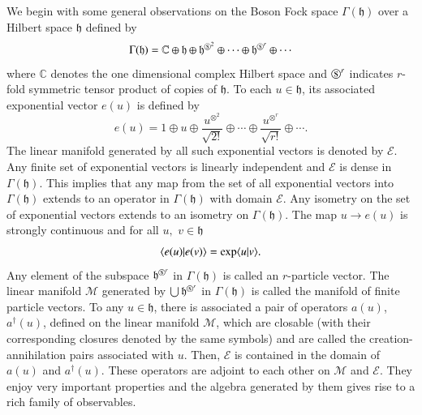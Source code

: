 We begin with some general observations on the Boson Fock space $\Gamma(\mathfrak{h})$ over a Hilbert space $\mathfrak{h}$ defined by 
\begin{equation}
\Gamma(\mathfrak{h})=\mathbb{C}\oplus \mathfrak{h} \oplus \mathfrak{h}^{\text{\textcircled{s}}^2} \oplus \cdots \oplus \mathfrak{h}^{\text{\textcircled{s}}^r}\oplus \cdots  \label{chap3-eq3.1}
\end{equation} 
where $\mathbb{C}$ denotes the one dimensional complex Hilbert space and  $\text{\textcircled{s}}^r$ indicates $r$-fold symmetric tensor product of copies of $\mathfrak{h}$. To each $u\in \mathfrak{h}$, its associated exponential vector $e(u)$ is defined by 
\begin{equation} 
e (u) = 1 \oplus u \oplus \frac{u^{\otimes^{2}}}{\sqrt{2!}}  \oplus \cdots \oplus \frac{u^{\otimes^{r}}}{\sqrt{r!}}  \oplus \cdots.\label{chap8-eq3.2}
\end{equation}
The linear manifold generated by all such exponential vectors is denoted by $\mathcal{E}$. Any finite set of exponential vectors is linearly independent and $\mathcal{E}$ is dense in $\Gamma(\mathfrak{h})$. This implies that any map from the set of all exponential vectors into 
$\Gamma(\mathfrak{h})$ extends to an operator in $\Gamma(\mathfrak{h})$ with domain $\mathcal{E}$. 
Any isometry on the set of exponential vectors extends to an isometry on $\Gamma(\mathfrak{h})$. The map $u\rightarrow e(u)$ is strongly continuous and for all $u,\,\, v\in \mathfrak{h}$ 
\begin{equation}
\langle e(u)\vert e(v)\rangle = {\rm exp}\langle u\vert v\rangle . \label{chap8-eq3.3}
\end{equation}
Any element of the subspace $\mathfrak{h}^{\text{\textcircled{s}}^r}$ in $\Gamma(\mathfrak{h})$ is called an $r$-particle vector. 
The linear manifold $\mathcal{M}$ generated by $\bigcup \mathfrak{h}^{\text{\textcircled{s}}^r}$ in  $\Gamma(\mathfrak{h})$ is called the manifold of finite particle vectors. To any $u\in \mathfrak{h}$, there is associated a pair of operators $a(u)$, $a^\dag(u)$, defined on the linear manifold $\mathcal{M}$, which are closable (with their corresponding closures denoted by the same symbols) and  are called the creation-annihilation pairs associated with $u$. Then, $\mathcal{E}$ is contained in the domain of $a(u)$ and $a^\dag(u)$. These operators  are adjoint to each other on $\mathcal{M}$ and $\mathcal{E}$. They enjoy very important properties and the algebra generated by them gives rise to a rich family of observables. 

